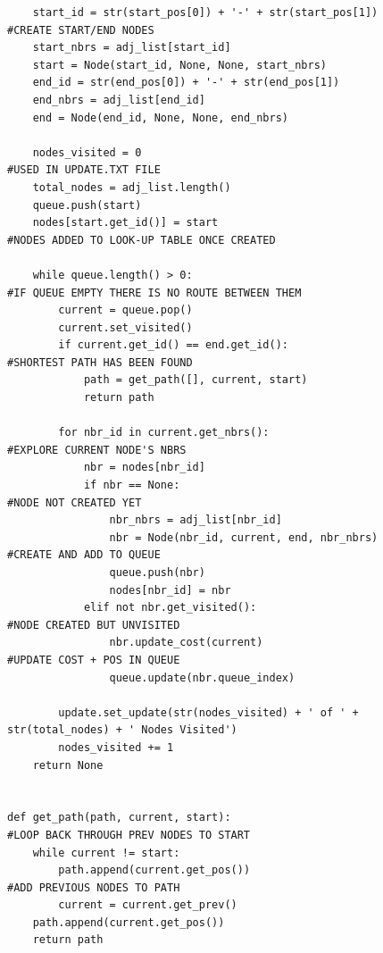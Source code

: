 \documentclass[titlepage]{article}
\begin{document}
\begin{changemargin}{-1in}{-1in}
\begin{verbatim}
    start_id = str(start_pos[0]) + '-' + str(start_pos[1])                      #CREATE START/END NODES
    start_nbrs = adj_list[start_id]
    start = Node(start_id, None, None, start_nbrs)
    end_id = str(end_pos[0]) + '-' + str(end_pos[1])
    end_nbrs = adj_list[end_id]
    end = Node(end_id, None, None, end_nbrs)

    nodes_visited = 0                                                           #USED IN UPDATE.TXT FILE
    total_nodes = adj_list.length()
    queue.push(start)
    nodes[start.get_id()] = start                                               #NODES ADDED TO LOOK-UP TABLE ONCE CREATED
    
    while queue.length() > 0:                                                   #IF QUEUE EMPTY THERE IS NO ROUTE BETWEEN THEM
        current = queue.pop()
        current.set_visited()
        if current.get_id() == end.get_id():                                    #SHORTEST PATH HAS BEEN FOUND
            path = get_path([], current, start)
            return path

        for nbr_id in current.get_nbrs():                                       #EXPLORE CURRENT NODE'S NBRS
            nbr = nodes[nbr_id]
            if nbr == None:                                                     #NODE NOT CREATED YET
                nbr_nbrs = adj_list[nbr_id]
                nbr = Node(nbr_id, current, end, nbr_nbrs)                      #CREATE AND ADD TO QUEUE
                queue.push(nbr)
                nodes[nbr_id] = nbr
            elif not nbr.get_visited():                                         #NODE CREATED BUT UNVISITED
                nbr.update_cost(current)                                        #UPDATE COST + POS IN QUEUE
                queue.update(nbr.queue_index)
            
        update.set_update(str(nodes_visited) + ' of ' + str(total_nodes) + ' Nodes Visited')
        nodes_visited += 1
    return None


def get_path(path, current, start):                                             #LOOP BACK THROUGH PREV NODES TO START
    while current != start:
        path.append(current.get_pos())                                          #ADD PREVIOUS NODES TO PATH  
        current = current.get_prev()
    path.append(current.get_pos())
    return path
\end{verbatim}
\end{changemargin} 


\pagebreak
\end{document}
